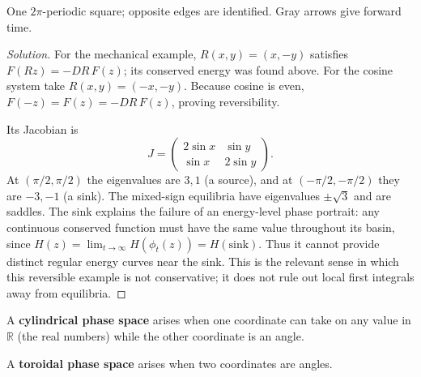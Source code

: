 \documentclass[12pt]{amsart}
\theoremstyle{plain}
\theoremstyle{definition}
\theoremstyle{definition}
\theoremstyle{plain}
\newenvironment{solution}
{\begin{proof}[Solution]}
{\end{proof}}
\begin{document}
\begin{center}
\begin{minipage}{\linewidth}

{\small One $2\pi$-periodic square; opposite edges are identified. Gray arrows give forward time.}
\end{minipage}
\end{center}


    \begin{solution}
    For the mechanical example, $R(x,y)=(x,-y)$ satisfies
    $F(Rz)=-DR\,F(z)$; its conserved energy was found above.
    For the cosine system take $R(x,y)=(-x,-y)$. Because cosine is even,
    $F(-z)=F(z)=-DR\,F(z)$, proving reversibility.

    Its Jacobian is
    \[
      J=\begin{pmatrix}2\sin x&\sin y\\\sin x&2\sin y\end{pmatrix}.
    \]
    At $(\pi/2,\pi/2)$ the eigenvalues are $3,1$ (a source), and at
    $(-\pi/2,-\pi/2)$ they are $-3,-1$ (a sink).
    The mixed-sign equilibria have eigenvalues $\pm\sqrt3$ and are saddles.
    The sink explains the failure of an energy-level phase portrait:
    any continuous conserved function must have the same value throughout
    its basin, since $H(z)=\lim_{t\to\infty}H(\phi_t(z))=H(\text{sink})$.
    Thus it cannot provide distinct regular energy curves near the sink.
    This is the relevant sense in which this reversible example is not
    conservative; it does not rule out local first integrals away from equilibria.
    \end{solution}
    \clearpage
    A \textbf{cylindrical phase space} arises when one coordinate can take on any value in $\mathbb
    R$ (the real numbers) while the other coordinate is an angle.

    A \textbf{toroidal phase space} arises when two coordinates are angles.
\end{document}
